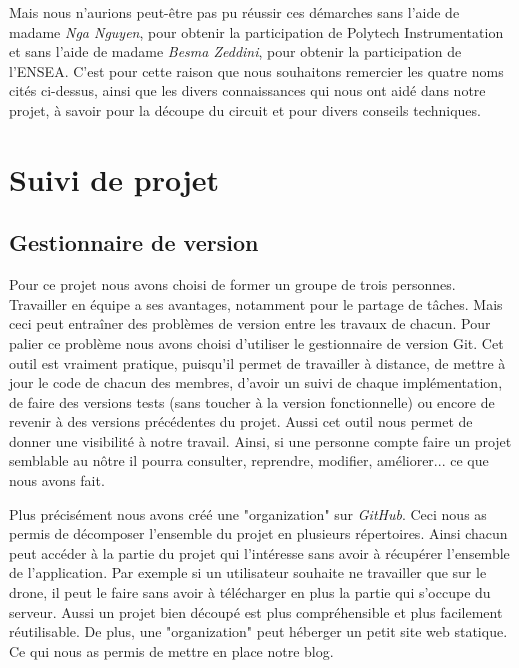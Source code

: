 \documentclass[a4paper,10pt]{report}
\begin{document}
    Mais nous n'aurions peut-être pas pu réussir ces démarches sans l'aide de 
madame \textit{Nga Nguyen}, pour obtenir la participation de Polytech 
Instrumentation et sans l'aide de madame \textit{Besma Zeddini}, pour obtenir 
la participation de l'ENSEA. C'est pour cette raison que nous souhaitons 
remercier les quatre noms cités ci-dessus, ainsi que les divers connaissances 
qui nous ont aidé dans notre projet, à savoir pour la découpe du circuit et pour 
divers conseils techniques.
   
  \appendix
    \chapter{Suivi de projet}
      \section{Gestionnaire de version}
	Pour ce projet nous avons choisi de former un groupe de trois 
personnes. Travailler en équipe a ses avantages, notamment pour le partage de 
tâches. Mais ceci peut entraîner des problèmes de version entre les travaux de 
chacun. Pour palier ce problème nous avons choisi d'utiliser le gestionnaire 
de version Git\cite{git}. Cet outil est vraiment pratique, puisqu'il permet de 
travailler à distance, de mettre à jour le code de chacun des membres, d'avoir 
un suivi de chaque implémentation, de faire des versions tests (sans toucher à 
la version fonctionnelle) ou encore de revenir à des versions précédentes du 
projet. Aussi cet outil nous permet de donner une visibilité à notre travail. 
Ainsi, si une personne compte faire un projet semblable au nôtre il pourra 
consulter, reprendre, modifier, améliorer... ce que nous avons fait.

	Plus précisément nous avons créé une "organization"\cite{njordgit} sur 
\textit{GitHub}\cite{github}. Ceci nous as permis de décomposer l'ensemble du 
projet en plusieurs répertoires. Ainsi chacun peut accéder à la partie du 
projet qui l'intéresse sans avoir à récupérer l'ensemble de l'application. Par 
exemple si un utilisateur souhaite ne travailler que sur le drone, il peut le 
faire sans avoir à télécharger en plus la partie qui s'occupe du serveur. Aussi 
un projet bien découpé est plus compréhensible et plus facilement réutilisable. 
De plus, une "organization" peut héberger un petit site web statique. Ce qui 
nous as permis de mettre en place notre blog\cite{njordblog}. 
	
\end{document}
